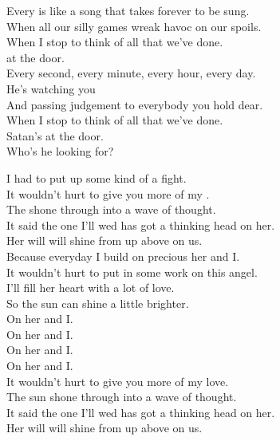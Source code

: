 Every  is like a song that takes forever to be sung. \\
When all our silly games wreak havoc on our spoils. \\
When I stop to think of all that we've done. \\
 at the door. \\

Every second, every minute, every hour, every day. \\
He's watching you \\
And passing judgement to everybody you hold dear. \\
When I stop to think of all that we've done. \\
Satan's at the door. \\
Who's he looking for? \\





I had to put up some kind of a fight. \\
It wouldn't hurt to give you more of my . \\
The  shone through into a wave of thought. \\
It said the one I'll wed has got a thinking head on her. \\

Her will will shine from up above on us. \\
Because everyday I build on precious her and I. \\
It wouldn't hurt to put in some work on this angel. \\
I'll fill her heart with a lot of love. \\
So the sun can shine a little brighter. \\

On her and I. \\
On her and I. \\
On her and I. \\
On her and I. \\

It wouldn't hurt to give you more of my love. \\
The sun shone through into a wave of thought. \\
It said the one I'll wed has got a thinking head on her. \\
Her will will shine from up above on us. \\

